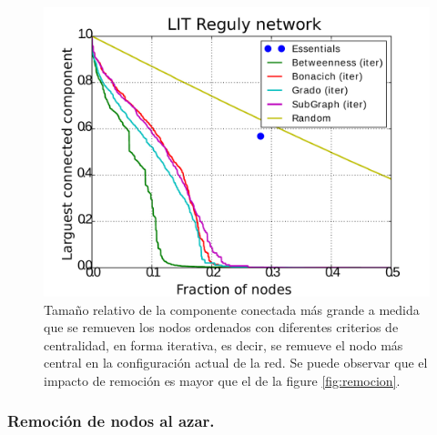 \begin{figure}
\includegraphics[scale = 0.3]{figuras/LIT_Reguly-eps-converted-to} 
\caption{Tamaño relativo de la componente conectada más grande a medida que se remueven los nodos ordenados con diferentes criterios de centralidad, en forma iterativa, es decir, se remueve el nodo más central en la configuración actual de la red. Se puede observar que el impacto de remoción es mayor que el de la figure \ref{fig:remocion}.}
\label{fig:remocion_alternativo}
\end{figure}

\subsubsection{Remoción de nodos al azar.}

